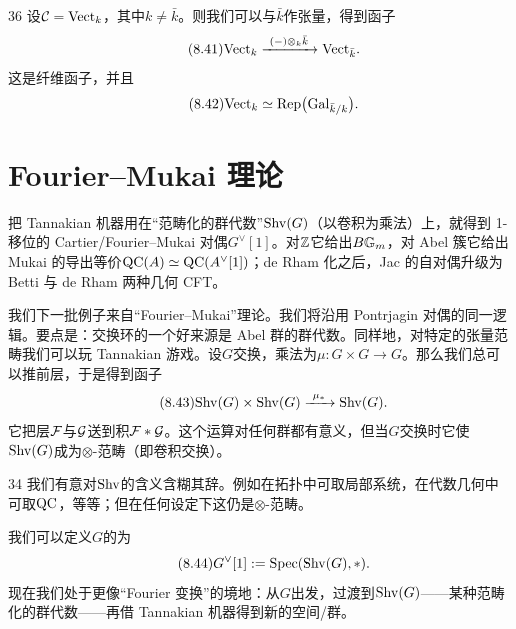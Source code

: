 \begin{srcex}{36}
设$\mathcal{C}=\mathrm{Vect}_k$，其中$k\neq\bar k$。则我们可以与$\bar k$作张量，得到函子
\begin{equation}\tag{8.41}
\mathrm{Vect}_k\xrightarrow{\ (-)\otimes_k\bar k\ }\mathrm{Vect}_{\bar k}.
\end{equation}
这是纤维函子，并且
\begin{equation}\tag{8.42}
\mathrm{Vect}_k\simeq\mathrm{Rep}\bigl(\mathrm{Gal}_{\bar k/k}\bigr).
\end{equation}
\end{srcex}

\section{Fourier--Mukai 理论}\label{sec:8.2}
\begin{sectionkey}
把 Tannakian 机器用在“范畴化的群代数”$\mathrm{Shv}(G)$（以卷积为乘法）上，就得到 1-移位的 Cartier/Fourier--Mukai 对偶$G^{\vee}[1]$。对$\mathbb{Z}$它给出$B\mathbb{G}_m$，对 Abel 簇它给出 Mukai 的导出等价$\mathrm{QC}(A)\simeq\mathrm{QC}(A^{\vee}[1])$；de Rham 化之后，Jac 的自对偶升级为 Betti 与 de Rham 两种几何 CFT。
\end{sectionkey}

我们下一批例子来自“Fourier--Mukai”理论。我们将沿用 Pontrjagin 对偶的同一逻辑。要点是：交换环的一个好来源是 Abel 群的群代数。同样地，对特定的张量范畴我们可以玩 Tannakian 游戏。设$G$交换，乘法为$\mu\colon G\times G\to G$。那么我们总可以推前层，于是得到函子
\begin{equation}\tag{8.43}
\mathrm{Shv}(G)\times\mathrm{Shv}(G)\xrightarrow{\ \mu_{*}\ }\mathrm{Shv}(G).
\end{equation}
它把层$\mathcal{F}$与$\mathcal{G}$送到积$\mathcal{F}*\mathcal{G}$。这个运算对任何群都有意义，但当$G$交换时它使$\mathrm{Shv}(G)$成为$\otimes$-范畴（即卷积交换）。

\begin{srcrem}{34}
我们有意对$\mathrm{Shv}$的含义含糊其辞。例如在拓扑中可取局部系统，在代数几何中可取$\mathrm{QC}$，等等；但在任何设定下这仍是$\otimes$-范畴。
\end{srcrem}

我们可以定义$G$的为
\begin{equation}\tag{8.44}
G^{\vee}[1]:=\mathrm{Spec}(\mathrm{Shv}(G),*).
\end{equation}
现在我们处于更像“Fourier 变换”的境地：从$G$出发，过渡到$\mathrm{Shv}(G)$——某种范畴化的群代数——再借 Tannakian 机器得到新的空间/群。

